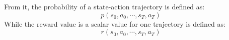 \documentclass[11pt]{article}
\begin{document}

From it, the probability of a state-action trajectory is defined as:
$$p\left(s_{0}, a_{0}, \cdots, s_{T}, a_{T}\right)$$
While the reward value is a scalar value for one trajectory is defined as:
$$r\left(s_{0}, a_{0}, \cdots, s_{T}, a_{T}\right)$$
\end{document}
